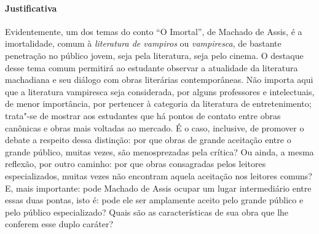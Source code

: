 \documentclass{extarticle}
\begin{document}
\paragraph{Justificativa} Evidentemente, um dos temas do conto ``O
Imortal'', de Machado de Assis, é a imortalidade, comum à
\emph{literatura de vampiros} ou \emph{vampiresca}, de bastante
penetração no público jovem, seja pela literatura, seja pelo cinema. O
destaque desse tema comum permitirá ao estudante observar a atualidade
da literatura machadiana e seu diálogo com obras literárias
contemporâneas. Não importa aqui que a literatura vampiresca seja
considerada, por alguns professores e intelectuais, de menor
importância, por pertencer à categoria da literatura de entretenimento;
trata"-se de mostrar aos estudantes que há pontos de contato entre obras
canônicas e obras mais voltadas ao mercado. É o caso, inclusive, de
promover o debate a respeito dessa distinção: por que obras de grande
aceitação entre o grande público, muitas vezes, são menosprezadas pela
crítica? Ou ainda, a mesma reflexão, por outro caminho: por que obras
consagradas pelos leitores especializados, muitas vezes não encontram
aquela aceitação nos leitores comuns? E, mais importante: pode Machado de Assis ocupar um
lugar intermediário entre essas duas pontas, isto é: pode ele ser
amplamente aceito pelo grande público e pelo público especializado?
Quais são as características de sua obra que lhe conferem esse duplo
caráter?
\end{document}
